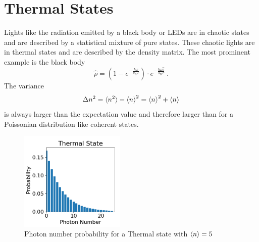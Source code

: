 \section{Thermal States}
Lights like the radiation emitted by a black body or LEDs are in chaotic states and are described by a statistical mixture of pure states. These chaotic lights are in thermal states and are described by the density matrix. The most prominent example is the black body 
\begin{equation}
    \hat{\rho}=\left(1-e^{-\frac{\hbar \omega}{k_\text{B} T}}\right) \cdot e^{-\frac{\hbar \omega \hat{n}}{k_\text{B} T}}~.
\end{equation}
The variance 
\begin{equation}
    \Delta n^{2}=\braket{n^{2}}-\braket{n}^{2}=\braket{n}^{2}+\braket{n}
\end{equation} is always larger than the expectation value and therefore larger than for a Poissonian distribution like coherent states.
\begin{figure}[H]
    \centering
    \includegraphics[width=50mm,scale=0.5]{Quantenoptik/include/Thermal state.PNG}
    \caption{Photon number probability for a Thermal state with $\braket{n}=5$} 
    \label{fig:Thermal state}
\end{figure}


